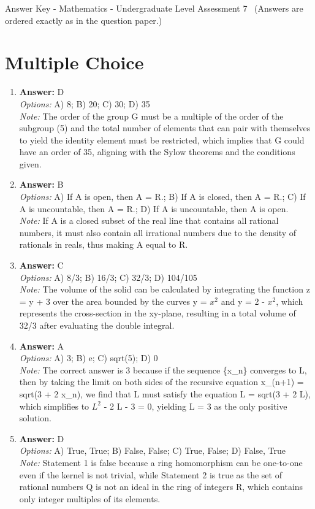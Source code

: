 \documentclass[12pt]{article}
\begin{document}
\begin{center}
Answer Key - Mathematics - Undergraduate Level Assessment 7 \
\small (Answers are ordered exactly as in the question paper.)
\end{center}

\section*{Multiple Choice}
\begin{enumerate}[label=\arabic*.]
\item \textbf{Answer:} D
\\ \textit{Options:} A) 8; B) 20; C) 30; D) 35
\\ \textit{Note:} The order of the group G must be a multiple of the order of the subgroup (5) and the total number of elements that can pair with themselves to yield the identity element must be restricted, which implies that G could have an order of 35, aligning with the Sylow theorems and the conditions given.
\item \textbf{Answer:} B
\\ \textit{Options:} A) If A is open, then A = R.; B) If A is closed, then A = R.; C) If A is uncountable, then A = R.; D) If A is uncountable, then A is open.
\\ \textit{Note:} If A is a closed subset of the real line that contains all rational numbers, it must also contain all irrational numbers due to the density of rationals in reals, thus making A equal to R.
\item \textbf{Answer:} C
\\ \textit{Options:} A) 8/3; B) 16/3; C) 32/3; D) 104/105
\\ \textit{Note:} The volume of the solid can be calculated by integrating the function z = y + 3 over the area bounded by the curves y = $x^2$ and y = 2 - $x^2$, which represents the cross-section in the xy-plane, resulting in a total volume of 32/3 after evaluating the double integral.
\item \textbf{Answer:} A
\\ \textit{Options:} A) 3; B) e; C) sqrt(5); D) 0
\\ \textit{Note:} The correct answer is 3 because if the sequence \{x\_n\} converges to L, then by taking the limit on both sides of the recursive equation x\_(n+1) = sqrt(3 + 2 x\_n), we find that L must satisfy the equation L = sqrt(3 + 2 L), which simplifies to $L^2$ - 2 L - 3 = 0, yielding L = 3 as the only positive solution.
\item \textbf{Answer:} D
\\ \textit{Options:} A) True, True; B) False, False; C) True, False; D) False, True
\\ \textit{Note:} Statement 1 is false because a ring homomorphism can be one-to-one even if the kernel is not trivial, while Statement 2 is true as the set of rational numbers Q is not an ideal in the ring of integers R, which contains only integer multiples of its elements.
\end{enumerate}
\end{document}
